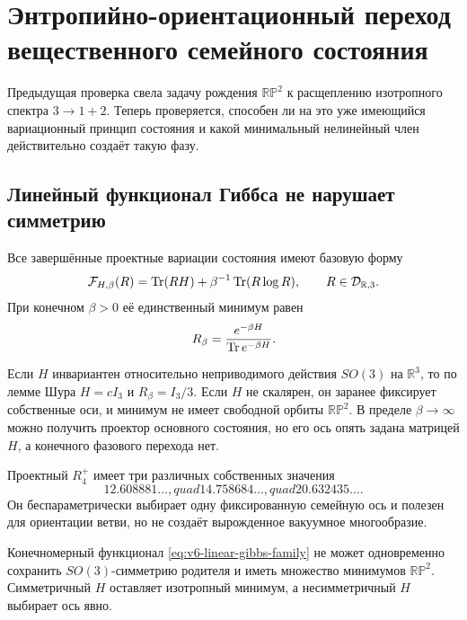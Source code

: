 \chapter{Энтропийно-ориентационный переход вещественного семейного состояния}

Предыдущая проверка свела задачу рождения $\mathbb{RP}^2$ к расщеплению
изотропного спектра $3\to1+2$. Теперь проверяется, способен ли на это уже
имеющийся вариационный принцип состояния и какой минимальный нелинейный
член действительно создаёт такую фазу.

\section{Линейный функционал Гиббса не нарушает симметрию}

Все завершённые проектные вариации состояния имеют базовую форму
\begin{equation}
 \mathcal F_{H,\beta}(R)
 =\operatorname{Tr}(RH)+\beta^{-1}\operatorname{Tr}(R\log R),
 \qquad R\in\mathcal D_{\mathbb R,3}.
 \label{eq:v6-linear-gibbs-family}
\end{equation}
При конечном $\beta>0$ её единственный минимум равен
\begin{equation}
 R_\beta=\frac{e^{-\beta H}}{\operatorname{Tr} e^{-\beta H}}.
 \label{eq:v6-linear-gibbs-minimum}
\end{equation}

Если $H$ инвариантен относительно неприводимого действия $SO(3)$ на
$\mathbb R^3$, то по лемме Шура $H=cI_3$ и
$R_\beta=I_3/3$. Если $H$ не скалярен, он заранее фиксирует собственные
оси, и минимум не имеет свободной орбиты $\mathbb{RP}^2$. В пределе
$\beta\to\infty$ можно получить проектор основного состояния, но его ось
опять задана матрицей $H$, а конечного фазового перехода нет.

Проектный $R_4^+$ имеет три различных собственных значения
\begin{equation}
 12.608881\ldots,quad14.758684\ldots,quad20.632435\ldots.
\end{equation}
Он беспараметрически выбирает одну фиксированную семейную ось и полезен для
ориентации ветви, но не создаёт вырожденное вакуумное многообразие.

\begin{theorem}
Конечномерный функционал \eqref{eq:v6-linear-gibbs-family} не может
одновременно сохранить $SO(3)$-симметрию родителя и иметь множество
минимумов $\mathbb{RP}^2$. Симметричный $H$ оставляет изотропный минимум,
а несимметричный $H$ выбирает ось явно.
\end{theorem}

